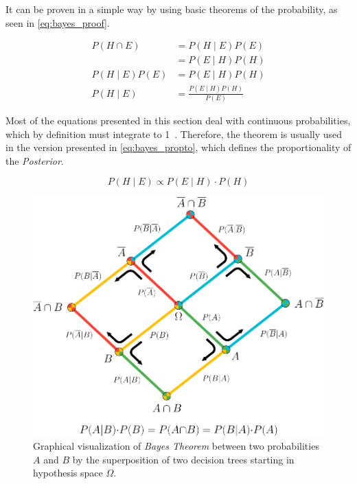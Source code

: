 It can be proven in a simple way by using basic theorems of the probability, as seen in \cref{eq:bayes_proof}.

\begin{equation}
\label{eq:bayes_proof}
\begin{aligned}
	P \left( H \cap E \right)
	&= P \left( H \mid E \right)P \left( E \right) \\
	&= P \left( E \mid H \right)P \left( H \right) \\
	P \left( H \mid E \right) P \left( E \right) &= P \left( E \mid H \right) P \left( H \right) \\
	P \left( H \mid E \right) &= \frac{P \left( E \mid H \right) P \left( H \right)}{P \left( E \right)}
\end{aligned}
\end{equation}

Most of the equations presented in this section deal with continuous probabilities, which by definition must integrate to 1~\cite{kolmogrov1956}. Therefore, the theorem is usually used in the version presented in \cref{eq:bayes_propto}, which defines the proportionality of the \emph{Posterior}.

\begin{equation}
\label{eq:bayes_propto}
	P \left( H \mid E \right) \propto P \left( E \mid H \right) \cdot P \left( H \right)
\end{equation}

\begin{figure}
\centering
\includegraphics[width=.7\textwidth]{figures/Bayes_Theorem.png}
\caption{Graphical visualization of \emph{Bayes Theorem} between two probabilities $A$ and $B$ by the superposition of two decision trees starting in hypothesis space $\Omega$.}
\label{fig:Bayes_Theorem}
\end{figure}

